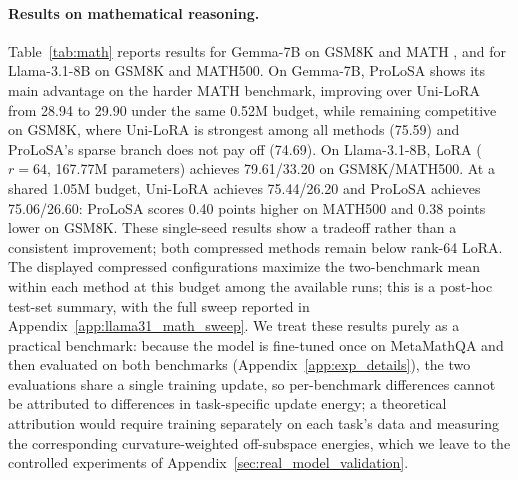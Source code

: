 \paragraph{Results on mathematical reasoning.}
Table~\ref{tab:math} reports results for Gemma-7B \citep{team2024gemma} on GSM8K \citep{cobbe2021training} and MATH \citep{hendrycks2021measuring}, and for Llama-3.1-8B on GSM8K and MATH500. On Gemma-7B, ProLoSA shows its main advantage on the harder MATH benchmark, improving over Uni-LoRA from 28.94 to 29.90 under the same 0.52M budget, while remaining competitive on GSM8K, where Uni-LoRA is strongest among all methods (75.59) and ProLoSA's sparse branch does not pay off (74.69).
On Llama-3.1-8B, LoRA ($r=64$, 167.77M parameters) achieves 79.61/33.20 on GSM8K/MATH500. At a shared 1.05M budget, Uni-LoRA achieves 75.44/26.20 and ProLoSA achieves 75.06/26.60: ProLoSA scores 0.40 points higher on MATH500 and 0.38 points lower on GSM8K. These single-seed results show a tradeoff rather than a consistent improvement; both compressed methods remain below rank-64 LoRA. The displayed compressed configurations maximize the two-benchmark mean within each method at this budget among the available runs; this is a post-hoc test-set summary, with the full sweep reported in Appendix~\ref{app:llama31_math_sweep}.
We treat these results purely as a practical benchmark: because the model is fine-tuned once on MetaMathQA and then evaluated on both benchmarks (Appendix~\ref{app:exp_details}), the two evaluations share a single training update, so per-benchmark differences cannot be attributed to differences in task-specific update energy; a theoretical attribution would require training separately on each task's data and measuring the corresponding curvature-weighted off-subspace energies, which we leave to the controlled experiments of Appendix~\ref{sec:real_model_validation}.
